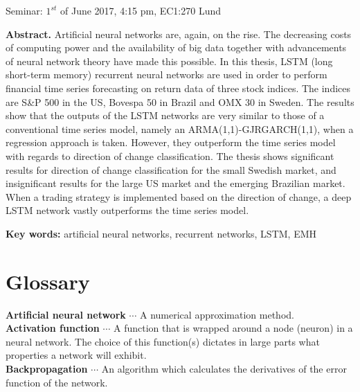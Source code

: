 \documentclass[12pt, letterpaper]{amsart}%
\begin{document}
\begin{titlepage}
\begin{center}
\vspace{1cm}

\large{Seminar: $1^{st}$ of June 2017, 4:15 pm, EC1:270 Lund}
\end{center}

\vspace{1cm}

\small{\textbf{Abstract.} Artificial neural networks are, again, on the rise. The decreasing costs of computing power and the availability of big data together with advancements of neural network theory have made this possible. In this thesis, LSTM (long short-term memory) recurrent neural networks are used in order to perform financial time series forecasting on return data of three stock indices. The indices are S\&P 500 in the US, Bovespa 50 in Brazil and OMX 30 in Sweden. The results show that the outputs of the LSTM networks are very similar to those of a conventional time series model, namely an ARMA(1,1)-GJRGARCH(1,1), when a regression approach is taken. However, they outperform the time series model with regards to direction of change classification. The thesis shows significant results for direction of change classification for the small Swedish market, and insignificant results for the large US market and the emerging Brazilian market. When a trading strategy is implemented based on the direction of change, a deep LSTM network vastly outperforms the time series model.}

\vfill

\small{\textbf{Key words:} artificial neural networks, recurrent networks, LSTM, EMH}
\end{titlepage}

\newpage


\newpage
\tableofcontents
\newpage

\section*{Glossary}
\noindent
\textbf{Artificial neural network} $\cdots$ A numerical approximation method.
\\

\noindent
\textbf{Activation function} $\cdots$ A function that is wrapped around a node (neuron) in a neural network. The choice of this function(s) dictates in large parts what properties a network will exhibit.
\\

\noindent
\textbf{Backpropagation} $\cdots$ An algorithm which calculates the derivatives of the error function of the network.
\\
\end{document}
